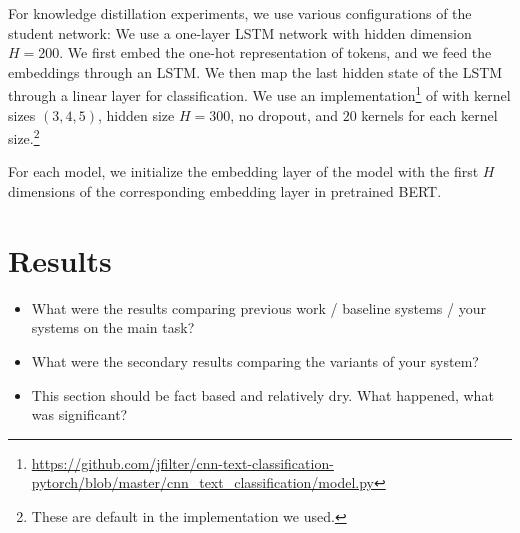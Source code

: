 \documentclass[10pt]{article}
\begin{document}
For knowledge distillation experiments, we use various configurations of the
student network:  We use a one-layer LSTM network with hidden
dimension $H=200$. We first embed the one-hot representation of tokens, and we
feed the embeddings through an LSTM. We then map the last hidden state of the
LSTM through a linear layer for classification.   We use an
implementation\footnote{\url{https://github.com/jfilter/cnn-text-classification-pytorch/blob/master/cnn_text_classification/model.py}}
of \citet{kim2014convolutional} with kernel sizes $(3,4,5)$, hidden size
$H=300$, no dropout, and $20$ kernels for each kernel size.\footnote{These are
default in the implementation we used.} 

For each model, we initialize the embedding layer of the model with the
first $H$ dimensions of the corresponding embedding layer in pretrained
BERT. 



\section{Results}

\begin{itemize}
\item What were the results comparing previous work / baseline systems / your
systems on the main task?
\item What were the secondary results comparing the variants of your system?
\item This section should be fact based and relatively dry. What happened, what
was significant?
\end{itemize}

\end{document}
